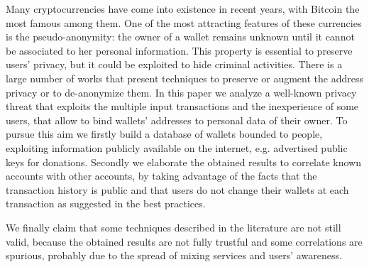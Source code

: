 Many cryptocurrencies have come into existence in recent years, with Bitcoin
the most famous among them. One of the most attracting features of these
currencies is the pseudo-anonymity: the owner of a wallet remains unknown until 
it cannot be associated to her personal information. 
This property is essential to preserve users' privacy, but it could be exploited to hide criminal activities. There is a large number of works that present techniques to preserve or augment the address privacy or to de-anonymize them.
In this paper we analyze a well-known 
privacy threat that exploits the multiple input transactions and the inexperience of some users, that allow to bind wallets' addresses to personal
data of their owner.
To pursue this aim we firstly build a database of wallets bounded
to people, exploiting information publicly available on the internet, e.g.
advertised public keys for donations. 
Secondly we elaborate the obtained results to correlate known accounts with other accounts, by taking advantage of
the facts that the transaction history is public and that users do not change
their wallets at each transaction as suggested in the best practices.

We finally claim that some techniques described in the literature are not
still valid, because the obtained results are not fully trustful and some
correlations are spurious, probably due to the spread of mixing services and 
users' awareness.





